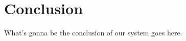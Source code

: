 \section{Conclusion}
\label{sec:conclusion}

What's gonna be the conclusion of our system goes here.

